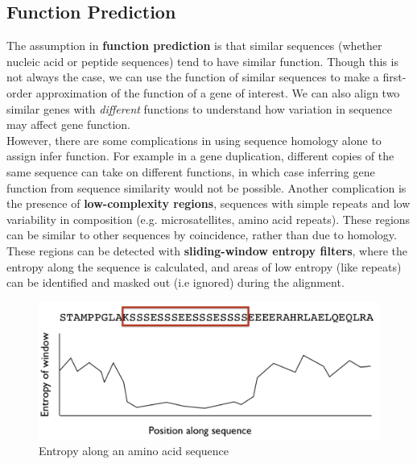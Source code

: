 \documentclass[12pt]{article}
\begin{document}
\subsection{Function Prediction}
The assumption in \textbf{function prediction} is that similar sequences (whether nucleic acid or peptide sequences) tend to have similar function. Though this is not always the case, we can use the function of similar sequences to make a first-order approximation of the function of a gene of interest. We can also align two similar genes with \textit{different} functions to understand how variation in sequence may affect gene function.\\[10pt]
However, there are some complications in using sequence homology alone to assign infer function. For example in a gene duplication, different copies of the same sequence can take on different functions, in which case inferring gene function from sequence similarity would not be possible. Another complication is the presence of \textbf{low-complexity regions}, sequences with simple repeats and low variability in composition (e.g. microsatellites, amino acid repeats). These regions can be similar to other sequences by coincidence, rather than due to homology. These regions can be detected with \textbf{sliding-window entropy filters}, where the entropy along the sequence is calculated, and areas of low entropy (like repeats) can be identified and masked out (i.e ignored) during the alignment.
\begin{figure}[h]
    \centering
    \includegraphics[width=.8\linewidth]{entropy_filter.png}
    \caption{Entropy along an amino acid sequence}
    \label{fig:entropy}
\end{figure}
\end{document}
